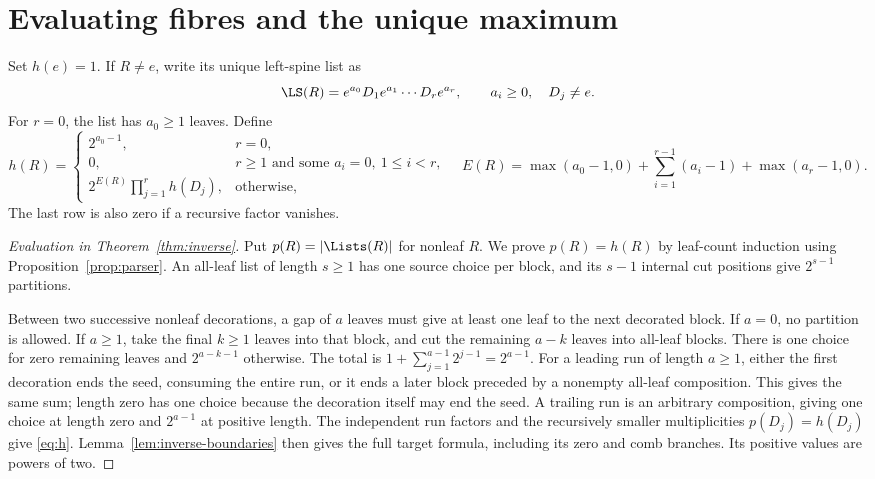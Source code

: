 \section{Evaluating fibres and the unique maximum}\label{sec:extremum}

Set \(h(e)=1\). If \(R\ne e\), write its unique left-spine list as
\[
 \LS(R)=e^{a_0}D_1e^{a_1}\cdots D_re^{a_r},
 \qquad a_i\ge0,\quad D_j\ne e.
\]
For \(r=0\), the list has \(a_0\ge1\) leaves. Define
\begin{equation}\label{eq:h}
 h(R)=
 \begin{cases}
 2^{a_0-1},&r=0,\\
 0,&r\ge1\text{ and some }a_i=0,\ 1\le i<r,\\
 2^{E(R)}\displaystyle\prod_{j=1}^r h(D_j),&\text{otherwise},
 \end{cases}
 \quad
 E(R)=\max(a_0-1,0)+
       \sum_{i=1}^{r-1}(a_i-1)+\max(a_r-1,0).
\end{equation}
The last row is also zero if a recursive factor vanishes.

\begin{proof}[Evaluation in Theorem~\ref{thm:inverse}]
Put \(p(R)=|\Lists(R)|\) for nonleaf \(R\). We prove \(p(R)=h(R)\)
by leaf-count induction using Proposition~\ref{prop:parser}.
An all-leaf list of length \(s\ge1\) has one source choice per block,
and its \(s-1\) internal cut positions give \(2^{s-1}\) partitions.

Between two successive nonleaf decorations, a gap of \(a\) leaves must
give at least one leaf to the next decorated block. If \(a=0\), no
partition is allowed. If \(a\ge1\), take the final \(k\ge1\) leaves into
that block, and cut the remaining \(a-k\) leaves into all-leaf blocks.
There is one choice for zero remaining leaves and \(2^{a-k-1}\) otherwise.
The total is \(1+\sum_{j=1}^{a-1}2^{j-1}=2^{a-1}\).
For a leading run of length \(a\ge1\), either the first decoration ends
the seed, consuming the entire run, or it ends a later block preceded by
a nonempty all-leaf composition. This gives the same sum; length zero
has one choice because the decoration itself may end the seed.
A trailing run is an arbitrary composition, giving one choice at length
zero and \(2^{a-1}\) at positive length. The independent run factors and
the recursively smaller multiplicities \(p(D_j)=h(D_j)\) give
\eqref{eq:h}. Lemma~\ref{lem:inverse-boundaries} then gives the full
target formula, including its zero and comb branches. Its positive
values are powers of two.
\end{proof}

